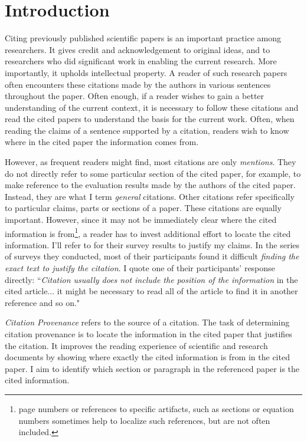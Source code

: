 \chapter{Introduction}
\label{introduction}
Citing previously published scientific papers is an important practice among researchers. It gives credit and acknowledgement to original ideas, and to researchers who did significant work in enabling the current research.  More importantly, it upholds intellectual property. A reader of such research papers often encounters these citations made by the authors in various sentences throughout the paper. Often enough, if a reader wishes to gain a better understanding of the current context, it is necessary to follow these citations and read the cited papers to understand the basis for the current work.  Often, when reading the claims of a sentence supported by a citation, readers wish to know where in the cited paper the information comes from.  

However, as frequent readers might find, most citations are only \textit{mentions}. They do not directly refer to some particular section of the cited paper, for example, to make reference to the evaluation results made by the authors of the cited paper. Instead, they are what I term {\it general} citations. Other citations refer specifically to particular claims, parts or sections of a paper.  These citations are equally important.  However, since it may not be immediately clear where the cited information is from\footnote{page numbers or references to specific artifacts, such as sections or equation numbers sometimes help to localize such references, but are not often included.}, a reader has to invest additional effort to locate the cited information. I'll refer to \cite{citation-sensitive} for their survey results to justify my claims. In the series of surveys they conducted, most of their participants found it difficult \textit{finding the exact text to justify the citation}. I quote one of their participants' response directly: ``\textit{Citation usually does not include the position of the information} in the cited article... it might be necessary to read all of the article to find it in another reference and so on." \cite{citation-sensitive}

{\it Citation Provenance} refers to the source of a citation. The task of determining citation provenance is to locate the information in the cited paper that justifies the citation. It improves the reading experience of scientific and research documents by showing where exactly the cited information is from in the cited paper. I aim to identify which section or paragraph in the referenced paper is the cited information. 


